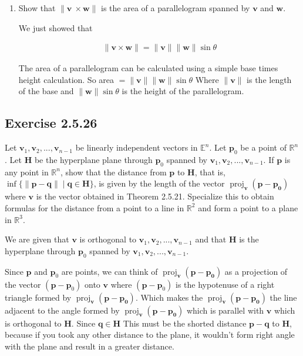 \documentclass{tufte-book}
\DeclareMathOperator{\proj}{proj}
\newcommand{\vct}{\mathbf}
\theoremstyle{mytheoremstyle}
\theoremstyle{mylemstyle}
\theoremstyle{mydefstyle}
\begin{document}
\begin{enumerate}
\item Show that $\|\vct{v}\ \times \vct{w}\|$ is the area of a parallelogram spanned by $\vct{v}$ and $\vct{w}$.

We just showed that 

\begin{align*}
\|\vct{v} \times \vct{w} \| = \|\vct{v}\|\|\vct{w}\|\sin\theta
\end{align*}

The area of a parallelogram can be calculated using a simple base times height calculation.  So area $=\|\vct{v}\|\|\vct{w}\|\sin \theta$  Where $\|\vct{v}\|$ is the length of the base and $\|\vct{w}\|\sin \theta$ is the height of the parallelogram.

\end{enumerate}

\subsection{Exercise 2.5.26}
Let $\mathbf{v}_1,\mathbf{v}_2,...,\mathbf{v}_{n-1}$ be linearly independent vectors in $\mathbb{E}^n$. Let $\mathbf{p}_0$ be a point of $\mathbb{R}^n$.  Let $\mathbf{H}$ be the hyperplane plane through $\mathbf{p}_0$ spanned by $\mathbf{v}_1,\mathbf{v}_2,...,\mathbf{v}_{n-1}$. If $\mathbf{p}$ is any point in $\mathbb{R}^n$, show that the distance from $\mathbf{p}$ to $\mathbf{H}$, that is, $\inf\{\|\mathbf{p}-\mathbf{q}\| \mid \mathbf{q} \in \mathbf{H} \}$, is given by the length of the vector $\proj_\vct{v}(\vct{p} - \vct{p_0})$ where $\vct{v}$ is the vector obtained in Theorem 2.5.21. Specialize this to obtain formulas for the distance from a point to a line in $\mathbb{R}^2$ and form a point to a plane in $\mathbb{R}^3$.


We are given that $\vct{v}$ is orthogonal to $\vct{v}_1,\vct{v}_2,...,\vct{v}_{n-1}$ and that $\mathbf{H}$ is the hyperplane through $\vct{p}_0$ spanned by $\vct{v}_1,\vct{v}_2,...,\vct{v}_{n-1}$.

Since $\vct{p}$ and $\vct{p}_0$ are points, we can think of $\proj_\vct{v}(\vct{p} - \vct{p_0})$ as a projection of the vector $(\vct{p} - \vct{p}_0)$ onto $\vct{v}$ where $(\vct{p} - \vct{p}_0)$ is the hypotenuse of a right triangle formed by $\proj_\vct{v}(\vct{p} - \vct{p_0})$. Which makes the $\proj_\vct{v}(\vct{p} - \vct{p_0})$ the line adjacent to the angle formed by $\proj_\vct{v}(\vct{p} - \vct{p_0})$  which is parallel with $\vct{v}$ which is orthogonal to $\mathbf{H}$.  Since $\vct{q} \in \mathbf{H}$  This must be the shorted distance  $\vct{p} -\vct{q}$ to $\mathbf{H}$, because if you took any other distance to the plane, it wouldn't form right angle with the plane and result in a greater distance.
\end{document}
